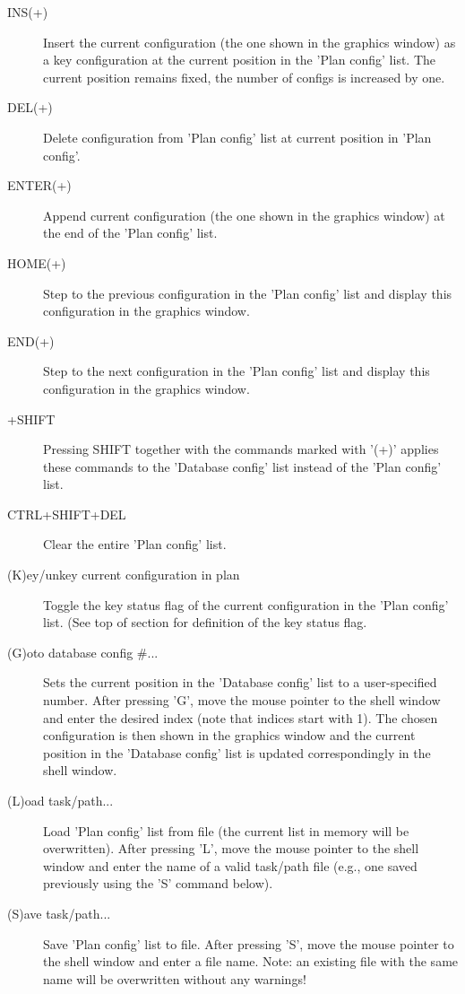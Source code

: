 \documentclass[letter,12pt]{article}
\begin{document}
\begin{description}
  
\item[INS(+)] Insert the current configuration (the one shown in the
  graphics window) as a key configuration at the current position in
  the 'Plan config' list.  The current position remains fixed, the
  number of configs is increased by one.
  
\item[DEL(+)] Delete configuration from 'Plan config' list at current
  position in 'Plan config'.
  
\item[ENTER(+)] Append current configuration (the one shown in the
  graphics window) at the end of the 'Plan config' list.
  
\item[HOME(+)] Step to the previous configuration in the 'Plan config'
  list and display this configuration in the graphics window.
  
\item[END(+)] Step to the next configuration in the 'Plan config' list
  and display this configuration in the graphics window.
  
\item[+SHIFT] Pressing SHIFT together with the commands marked with
  '(+)' applies these commands to the 'Database config' list instead of
  the 'Plan config' list.

\item[CTRL+SHIFT+DEL] Clear the entire 'Plan config' list.
  
\item[(K)ey/unkey current configuration in plan] Toggle the key status
  flag of the current configuration in the 'Plan config' list. (See
  top of section for definition of the key status flag.
  
\item[(G)oto database config \#...]  Sets the current position in the
  'Database config' list to a user-specified number.  After pressing
  'G', move the mouse pointer to the shell window and enter the
  desired index (note that indices start with 1).  The chosen
  configuration is then shown in the graphics window and the current
  position in the 'Database config' list is updated correspondingly in
  the shell window.
  
\item[(L)oad task/path...]  Load 'Plan config' list from file (the
  current list in memory will be overwritten).  After pressing 'L',
  move the mouse pointer to the shell window and enter the name of a
  valid task/path file (e.g., one saved previously using the 'S' command
  below).
  
\item[(S)ave task/path...] Save 'Plan config' list to file.  After
  pressing 'S', move the mouse pointer to the shell window and enter a
  file name.  Note: an existing file with the same name will be
  overwritten without any warnings!
 
\end{description}
\end{document}
